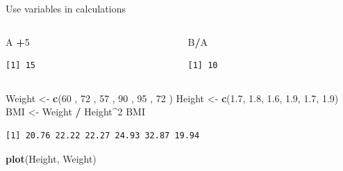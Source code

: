\documentclass[
  11pt,
  ignorenonframetext,
]{beamer}
\newenvironment{Shaded}{\begin{snugshade}}{\end{snugshade}}
\newcommand{\DecValTok}[1]{\textcolor[rgb]{0.00,0.00,0.81}{#1}}
\newcommand{\FloatTok}[1]{\textcolor[rgb]{0.00,0.00,0.81}{#1}}
\newcommand{\FunctionTok}[1]{\textcolor[rgb]{0.13,0.29,0.53}{\textbf{#1}}}
\newcommand{\NormalTok}[1]{#1}
\newcommand{\OtherTok}[1]{\textcolor[rgb]{0.56,0.35,0.01}{#1}}
\newcommand{\SpecialCharTok}[1]{\textcolor[rgb]{0.81,0.36,0.00}{\textbf{#1}}}
\begin{document}
\begin{frame}[fragile]{Use variables in calculations}
\protect\hypertarget{use-variables-in-calculations}{}
\begin{columns}[T,onlytextwidth]
\begin{column}{0.45\textwidth}
\begin{Shaded}
\begin{Highlighting}[]
\NormalTok{A }\SpecialCharTok{+}\DecValTok{5}
\end{Highlighting}
\end{Shaded}

\begin{verbatim}
[1] 15
\end{verbatim}
\end{column}

\begin{column}{0.45\textwidth}
\begin{Shaded}
\begin{Highlighting}[]
\NormalTok{B}\SpecialCharTok{/}\NormalTok{A}
\end{Highlighting}
\end{Shaded}

\begin{verbatim}
[1] 10
\end{verbatim}
\end{column}
\end{columns}

\begin{Shaded}
\begin{Highlighting}[]
\NormalTok{Weight }\OtherTok{\textless{}{-}} \FunctionTok{c}\NormalTok{(}\DecValTok{60}\NormalTok{ , }\DecValTok{72}\NormalTok{ , }\DecValTok{57}\NormalTok{ , }\DecValTok{90}\NormalTok{ , }\DecValTok{95}\NormalTok{ , }\DecValTok{72}\NormalTok{ )}
\NormalTok{Height }\OtherTok{\textless{}{-}} \FunctionTok{c}\NormalTok{(}\FloatTok{1.7}\NormalTok{, }\FloatTok{1.8}\NormalTok{, }\FloatTok{1.6}\NormalTok{, }\FloatTok{1.9}\NormalTok{, }\FloatTok{1.7}\NormalTok{, }\FloatTok{1.9}\NormalTok{)}
\NormalTok{BMI }\OtherTok{\textless{}{-}}\NormalTok{ Weight }\SpecialCharTok{/}\NormalTok{ Height}\SpecialCharTok{\^{}}\DecValTok{2}
\NormalTok{BMI}
\end{Highlighting}
\end{Shaded}

\begin{verbatim}
[1] 20.76 22.22 22.27 24.93 32.87 19.94
\end{verbatim}

\begin{Shaded}
\begin{Highlighting}[]
\FunctionTok{plot}\NormalTok{(Height, Weight)}
\end{Highlighting}
\end{Shaded}
\end{frame}
\end{document}

